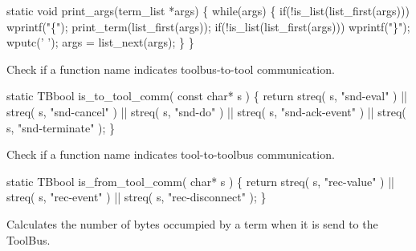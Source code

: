 \nwenddocs{}\endmoddef\let\nwnotused=\nwoutput{}\nwstartdeflinemarkup{}\nwenddeflinemarkup
static void print_args(term_list *args)
\{
  while(args) \{
    if(!is_list(list_first(args)))
      wprintf("\{");
    print_term(list_first(args));
    if(!is_list(list_first(args)))
      wprintf("\}");
    wputc(' ');
    args = list_next(args);
  \}
\}
\nwendcode{}\nwdocspar


Check if a function name indicates toolbus-to-tool communication.

\nwenddocs{}\endmoddef\let\nwnotused=\nwoutput{}\nwstartdeflinemarkup{}\nwenddeflinemarkup
static TBbool is_to_tool_comm( const char* s )
\{
   return streq( s, "snd-eval" )      || 
          streq( s, "snd-cancel" )    ||
          streq( s, "snd-do" )        || 
          streq( s, "snd-ack-event" ) ||
          streq( s, "snd-terminate" );
\}
\nwendcode{}\nwdocspar


Check if a function name indicates tool-to-toolbus communication.

\nwenddocs{}\endmoddef\let\nwnotused=\nwoutput{}\nwstartdeflinemarkup{}\nwenddeflinemarkup
static TBbool is_from_tool_comm( char* s )
\{
   return streq( s, "rec-value" ) ||  
          streq( s, "rec-event" ) ||
          streq( s, "rec-disconnect" );
\}
\nwendcode{}\nwdocspar


Calculates the number of bytes occumpied by a term when it is send
to the ToolBus.

